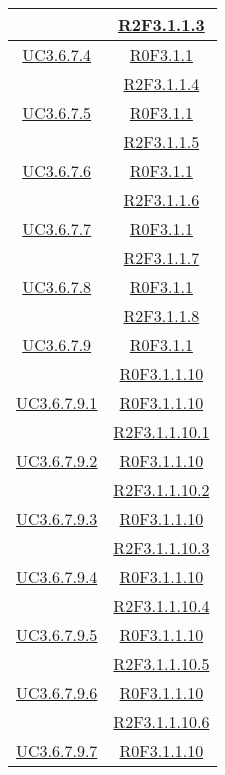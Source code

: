 \begin{longtable}{|c|c|}
& \hyperlink{R2F3.1.1.3}{R2F3.1.1.3}\\
\hline
\hyperlink{UC3.6.7.4}{UC3.6.7.4} & \hyperlink{R0F3.1.1}{R0F3.1.1}\\
& \hyperlink{R2F3.1.1.4}{R2F3.1.1.4}\\
\hline
\hyperlink{UC3.6.7.5}{UC3.6.7.5} & \hyperlink{R0F3.1.1}{R0F3.1.1}\\
& \hyperlink{R2F3.1.1.5}{R2F3.1.1.5}\\
\hline
\hyperlink{UC3.6.7.6}{UC3.6.7.6} & \hyperlink{R0F3.1.1}{R0F3.1.1}\\
& \hyperlink{R2F3.1.1.6}{R2F3.1.1.6}\\
\hline
\hyperlink{UC3.6.7.7}{UC3.6.7.7} & \hyperlink{R0F3.1.1}{R0F3.1.1}\\
& \hyperlink{R2F3.1.1.7}{R2F3.1.1.7}\\
\hline
\hyperlink{UC3.6.7.8}{UC3.6.7.8} & \hyperlink{R0F3.1.1}{R0F3.1.1}\\
& \hyperlink{R2F3.1.1.8}{R2F3.1.1.8}\\
\hline
\hyperlink{UC3.6.7.9}{UC3.6.7.9} & \hyperlink{R0F3.1.1}{R0F3.1.1}\\
& \hyperlink{R0F3.1.1.10}{R0F3.1.1.10}\\
\hline
\hyperlink{UC3.6.7.9.1}{UC3.6.7.9.1} & \hyperlink{R0F3.1.1.10}{R0F3.1.1.10}\\
& \hyperlink{R2F3.1.1.10.1}{R2F3.1.1.10.1}\\
\hline
\hyperlink{UC3.6.7.9.2}{UC3.6.7.9.2} & \hyperlink{R0F3.1.1.10}{R0F3.1.1.10}\\
& \hyperlink{R2F3.1.1.10.2}{R2F3.1.1.10.2}\\
\hline
\hyperlink{UC3.6.7.9.3}{UC3.6.7.9.3} & \hyperlink{R0F3.1.1.10}{R0F3.1.1.10}\\
& \hyperlink{R2F3.1.1.10.3}{R2F3.1.1.10.3}\\
\hline
\hyperlink{UC3.6.7.9.4}{UC3.6.7.9.4} & \hyperlink{R0F3.1.1.10}{R0F3.1.1.10}\\
& \hyperlink{R2F3.1.1.10.4}{R2F3.1.1.10.4}\\
\hline
\hyperlink{UC3.6.7.9.5}{UC3.6.7.9.5} & \hyperlink{R0F3.1.1.10}{R0F3.1.1.10}\\
& \hyperlink{R2F3.1.1.10.5}{R2F3.1.1.10.5}\\
\hline
\hyperlink{UC3.6.7.9.6}{UC3.6.7.9.6} & \hyperlink{R0F3.1.1.10}{R0F3.1.1.10}\\
& \hyperlink{R2F3.1.1.10.6}{R2F3.1.1.10.6}\\
\hline
\hyperlink{UC3.6.7.9.7}{UC3.6.7.9.7} & \hyperlink{R0F3.1.1.10}{R0F3.1.1.10}\\

\end{longtable}

